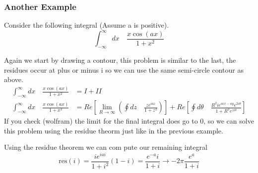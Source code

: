 \documentclass{article}
\newcommand{\be}{\begin{equation}}
\newcommand{\ee}{\end{equation}}
\begin{document}
\subsubsection*{Another Example}
Consider the following integral (Assume a is positive). 
\be
\int_{-\infty}^\infty dx \quad \frac{x\cos(ax)}{1+x^2}
\ee

Again we start by drawing a contour, this problem is similar to the last, the residues occur at plus or minus i so we can use the same semi-circle contour as above.
\be
\begin{split}
    \int_{-\infty}^\infty dx \quad \frac{x\cos(ax)}{1+x^2} &= I + II\\
    \int_{-\infty}^\infty dx \quad \frac{x\cos(ax)}{1+x^2} &=  Re\left[\lim_{R \rightarrow \infty}{\left(\oint dz \quad \frac{ze^{iaz}}{1+z^2}\right)} \right]+ Re\left[\oint d\theta \quad \frac{R^2ie^{aix-ay}e^{2i\theta}}{1+R^2e^{zi\theta}} \right]
\end{split}
\ee
If you check (wolfram) the limit for the final integral does go to 0, so we can solve this problem using the residue theorm just like in the previous example. 

Using the residue theorem we can com pute our remaining integral
\be
\text{res}(i) = \frac{ie^{iai}}{1+i^2}(1-i) = \frac{e^{-a}i}{1+i} \rightarrow -2\pi \frac{e^a}{1+i}
\ee
\end{document}
